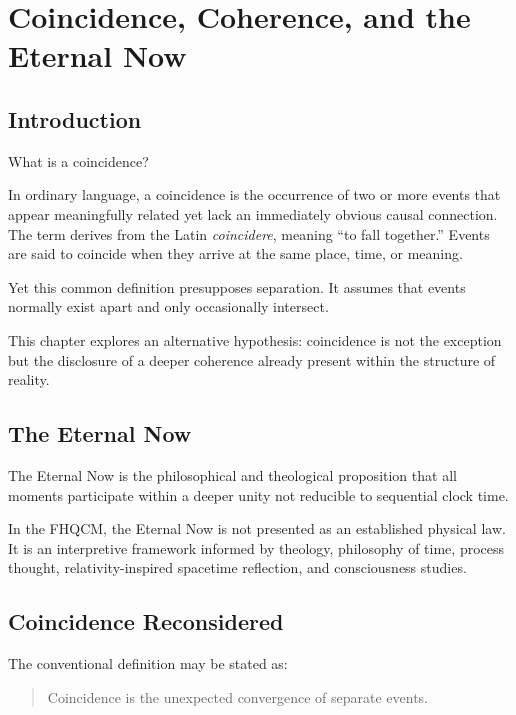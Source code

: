 \chapter{Coincidence, Coherence, and the Eternal Now}

\section{Introduction}

What is a coincidence?

In ordinary language, a coincidence is the occurrence of two or more events that appear meaningfully related yet lack an immediately obvious causal connection. The term derives from the Latin \emph{coincidere}, meaning ``to fall together.'' Events are said to coincide when they arrive at the same place, time, or meaning.

Yet this common definition presupposes separation. It assumes that events normally exist apart and only occasionally intersect.

This chapter explores an alternative hypothesis: coincidence is not the exception but the disclosure of a deeper coherence already present within the structure of reality.

\section{The Eternal Now}

The Eternal Now is the philosophical and theological proposition that all moments participate within a deeper unity not reducible to sequential clock time.

In the FHQCM, the Eternal Now is not presented as an established physical law. It is an interpretive framework informed by theology, philosophy of time, process thought, relativity-inspired spacetime reflection, and consciousness studies.


\section{Coincidence Reconsidered}

The conventional definition may be stated as:

\begin{quote}
Coincidence is the unexpected convergence of separate events.
\end{quote}

